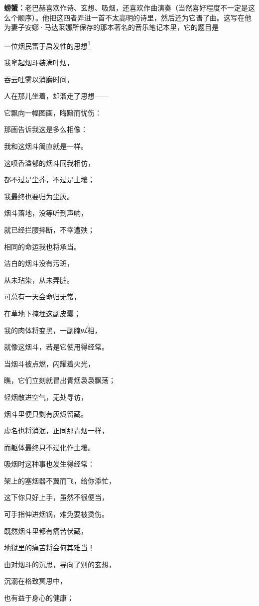 \documentclass[
  12pt,
  twoside,
  openright,
  oldfontcommands,
]{memoir}
\newcommand{\dialogname}[1]{{\heifamily\bfseries #1}}
\begin{document}
\dialogname{螃蟹：}老巴赫喜欢作诗、玄想、吸烟，还喜欢作曲演奏（当然喜好程度不一定是这么个顺序）。他把这四者弄进一首不太高明的诗里，然后还为它谱了曲。这写在他为妻子安娜·马达莱娜所保存的那本著名的音乐笔记本里，它的题目是

一位烟民富于启发性的思想\hyperref[fn:Dialog16-1]{\textsuperscript{1}}

我拿起烟斗装满叶烟，

吞云吐雾以消磨时间，

人在那儿坐着，却溜走了思想------

它飘向一幅图画，晦黯而忧伤：

那画告诉我这是多么相像：

我和这烟斗简直就是一样。

这喷香溢郁的烟斗同我相仿，

都不过是尘芥，不过是土壤；

我最终也要归为尘灰。

烟斗落地，没等听到声响，

就已经拦腰摔断，不幸遭殃；

相同的命运我也将承当。

洁白的烟斗没有污斑，

从未玷染，从未弄脏。

可总有一天会命归无常，

在草地下掩埋这副皮囊；

我的肉体将变黑，一副腌{\gebfont ꪡ}相，

就像这烟斗，若是它使用得经常。

当烟斗被点燃，闪耀着火光，

瞧，它们立刻就冒出青烟袅袅飘荡；

轻烟散进空气，无处寻访，

烟斗里便只剩有灰烬留藏。

虚名也将消泯，正同那青烟一样，

而躯体最终只不过化作土壤。

吸烟时这种事也发生得经常：

架上的塞烟器不翼而飞，给你添忙，

这下你只好上手，虽然不很便当，

可手指伸进烟锅，难免要被烫伤。

既然烟斗里都有痛苦伏藏，

地狱里的痛苦将会何其难当！

由对烟斗的沉思，导向了别的玄想，

沉溺在格致冥思中，

也有益于身心的健康；
\end{document}
